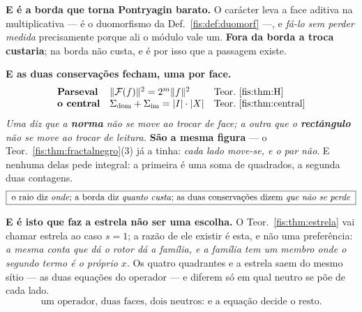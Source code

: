 \documentclass[livro.tex]{subfiles}
\begin{document}
\medskip\noindent\textbf{E é a borda que torna Pontryagin barato.} O carácter leva
a face aditiva na multiplicativa --- é o duomorfismo da
Def.~\ref{fis:def:duomorf} ---, e \emph{fá-lo sem perder medida} precisamente
porque ali o módulo vale um. \textbf{Fora da borda a troca custaria}; na borda não
custa, e é por isso que a passagem existe.

\medskip\noindent\textbf{E as duas conservações fecham, uma por face.}
\[
\begin{array}{lll}
\textbf{Parseval} & \lVert\mathcal{F}(f)\rVert^{2}=2^{m}\lVert f\rVert^{2} & \text{Teor.~\ref{fis:thm:H}}\\
\textbf{o central} & \Sigma_{\mathrm{dom}}+\Sigma_{\mathrm{im}}=\lvert I\rvert\cdot\lvert X\rvert & \text{Teor.~\ref{fis:thm:central}}
\end{array}
\]
\emph{Uma diz que a \textbf{norma} não se move ao trocar de face; a outra que o
\textbf{rectângulo} não se move ao trocar de leitura.} \textbf{São a mesma figura}
--- o Teor.~\ref{fis:thm:fractalnegro}(3) já a tinha: \emph{cada lado move-se, e o
par não}. E nenhuma delas pede integral: a primeira é uma soma de quadrados, a
segunda duas contagens.
\[
\boxed{\;\text{o raio diz \emph{onde}; a borda diz \emph{quanto custa}; as duas conservações dizem \emph{que não se perde}}\;}
\]

\medskip\noindent\textbf{E é isto que faz a estrela não ser uma escolha.} O
Teor.~\ref{fis:thm:estrela} vai chamar estrela ao caso $s=1$; a razão de ele
existir é esta, e não uma preferência: \emph{a mesma conta que dá o rotor dá a
família, e a família tem um membro onde o segundo termo é o próprio $x$}. Os
quatro quadrantes e a estrela saem do mesmo sítio --- as duas equações do
operador --- e diferem só em qual neutro se põe de cada lado.
\[
\boxed{\;\text{um operador, duas faces, dois neutros: e a equação decide o resto.}\;}
\]
\end{document}

